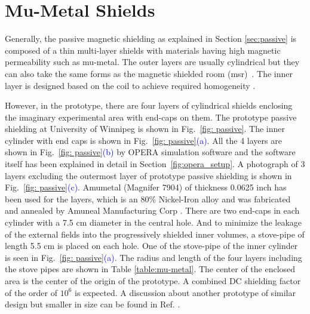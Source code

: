 \section{Mu-Metal Shields}\label{sec:shield}
Generally, the passive magnetic shielding as explained in Section \ref{sec:passive} is composed of a thin multi-layer shields with materials having high magnetic permeability such as mu-metal. The outer layers are usually cylindrical \cite{mu_cyl_1,mu_cyl_2} but they can also take the same forms as the magnetic shielded room (msr)~\cite{mu_msr_1,mu_msr_2}. The inner layer is designed based on the coil to achieve required homogeneity \cite{mu_inner_1,mu_inner_2}. 



However, in the prototype, there are four layers of cylindrical shields enclosing the imaginary experimental area with end-caps on them. The prototype passive shielding at University of Winnipeg is shown in Fig.~\ref{fig: passive}. The inner cylinder with end caps is shown in Fig.~\ref{fig: passive}\textcolor{blue}{(a)}. All the 4 layers are shown in Fig.~\ref{fig: passive}\textcolor{blue}{(b)} by OPERA simulation software and the software itself has been explained in detail in Section~\ref{fig:opera_setup}. A photograph of 3 layers excluding the outermost layer of prototype passive shielding is shown in Fig.~\ref{fig: passive}\textcolor{blue}{(c)}. Amumetal (Magnifer 7904) of thickness 0.0625 inch has been used for the layers,  which is an 80\% Nickel-Iron alloy and was fabricated and annealed by Amuneal Manufacturing Corp \cite{mu-metal}.  There are two end-caps in each cylinder with a 7.5 cm diameter in the central hole. And to minimize the leakage of the external fields into the progressively shielded inner volumes, a stove-pipe of length 5.5 cm is placed on each hole. One of the stove-pipe of the inner cylinder is seen in Fig.~\ref{fig: passive}\textcolor{blue}{(a)}. The radius and length of the four layers including the stove pipes are shown in Table \ref{table:mu-metal}. The center of the enclosed area is the center of the origin of the prototype. A combined DC shielding factor of the order of $\mathrm{10^6}$ is expected. A discussion about another prototype of similar design but smaller in size can be found in Ref. \cite{baby_shield}.

